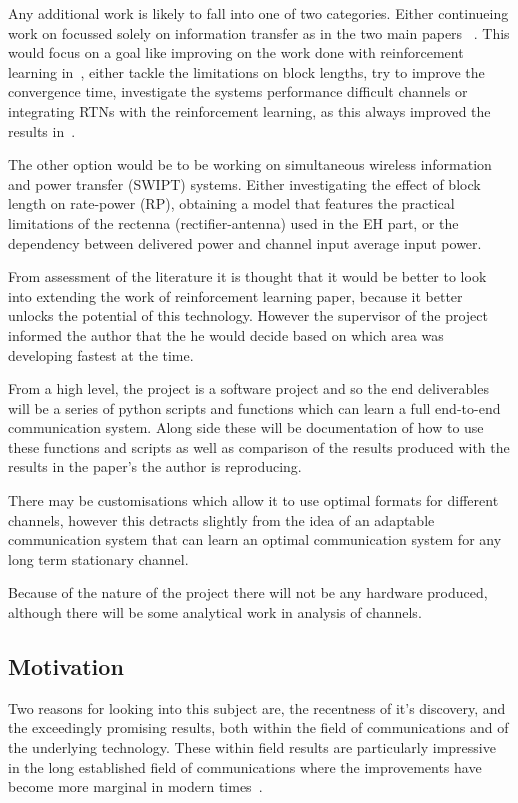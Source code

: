 \documentclass[12pt,onecolumn,letterpaper]{article}
\begin{document}
Any additional work is likely to fall into one of two categories. Either continueing work on focussed solely on information transfer as in the two main papers ~\cite{oShea,Aoudia}. This would focus on a goal like improving on the work done with reinforcement learning in~\cite{Aoudia}, either tackle the limitations on block lengths, try to improve the convergence time, investigate the systems performance difficult channels or integrating RTNs with the reinforcement learning, as this always improved the results in~\cite{oShea}.

The other option would be to be working on simultaneous wireless information and power transfer (SWIPT) systems. Either investigating the effect of block length on rate-power (RP), obtaining a model that features the practical limitations of the rectenna (rectifier-antenna) used in the EH part, or the dependency between delivered power and channel input average input power.

From assessment of the literature it is thought that it would be better to look into extending the work of reinforcement learning paper, because it better unlocks the potential of this technology. However the supervisor of the project informed the author that the he would decide based on which area was developing fastest at the time.  

From a high level, the project is a software project and so the end deliverables will be a series of python scripts and functions which can learn a full end-to-end communication system. Along side these will be documentation of how to use these functions and scripts as well as comparison of the results produced with the results in the paper's the author is reproducing.

There may be customisations which allow it to use optimal formats for different channels, however this detracts slightly from the idea of an adaptable communication system that can learn an optimal communication system for any long term stationary channel.

Because of the nature of the project there will not be any hardware produced, although there will be some analytical work in analysis of channels.

\subsection{Motivation}

Two reasons for looking into this subject are, the recentness of it's discovery, and the exceedingly promising results, both within the field of communications and of the underlying technology. These within field results are particularly impressive in the long established field of communications where the improvements have become more marginal in modern times~\cite{oShea}.
\end{document}
